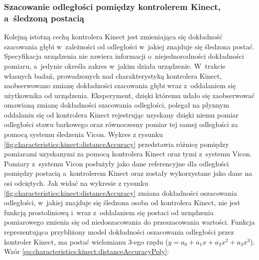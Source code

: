 																																					
\subsubsection*{Szacowanie odległości pomiędzy kontrolerem Kinect, a~śledzoną postacią}\label{sssection:distanceEstimation}
Kolejną istotną cechą kontrolera Kinect jest zmieniająca się dokładność szacowania głębi w~zależności od odległości w~jakiej znajduje się śledzona postać. Specyfikacja urządzenia nie zawiera informacji o~niejednorodności dokładności pomiaru, a~jedynie określa zakres w~jakim działa urządzenie. W~trakcie własnych badań, prowadzonych nad charakterystyką kontrolera Kinect, zaobserwowano zmianę dokładności szacowania głębi wraz z~oddalaniem się użytkownika od urządzenia. Eksperyment, dzięki któremu udało się zaobserwować omawianą zmianę dokładności szacowania odległości, polegał na płynnym oddalaniu się od kontrolera Kinect rejestrując uzyskany dzięki niemu pomiar odległości stawu barkowego oraz równoczesny pomiar tej samej odległości za pomocą systemu śledzenia Vicon. Wykres z rysunku \ref{fig:characteristics:kinect:distanceAccuracy} przedstawia różnicę pomiędzy pomiarami uzyskanymi za pomocą kontrolera Kinect oraz tymi z~systemu Vicon. Pomiary z~systemu Vicon posłużyły jako dane referencyjne dla odległości pomiędzy postacią a~kontrolerem Kinect oraz zostały wykorzystane jako dane na osi odciętych. Jak widać na wykresie z rysunku \ref{fig:characteristics:kinect:distanceAccuracy} zmiana dokładności oszacowania odległości, w~jakiej znajduje się śledzona osoba od kontrolera Kinect, nie jest funkcją prostoliniową i~wraz z~oddalaniem się postaci od urządzenia pomiarowego zmienia się od niedoszacowania do przeszacowania wartości. Funkcja reprezentująca przybliżony model dokładności oszacowania odległości przez kontroler Kinect, ma postać wielomianu 3-ego rzędu ($y = a_0 + a_1x + a_2x^2 + a_3x^3$). Wzór \ref{eq:characteristics:kinect:distanceAccuracyPoly}: 
																																							
